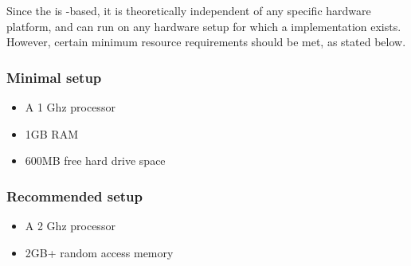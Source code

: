 Since the \ite{} is -based, it is theoretically independent of any specific hardware platform, and can run on any hardware setup for which a  implementation exists. However, certain minimum resource requirements should be met, as stated below.

\subsubsection{Minimal setup}
\begin{itemize}
\item A 1 Ghz processor
\item 1GB RAM
\item 600MB free hard drive space
\end{itemize}
\subsubsection{Recommended setup}
\begin{itemize}
\item A 2 Ghz processor
\item 2GB+ random access memory

\end{itemize}
